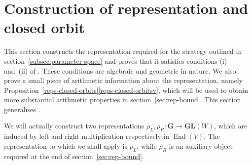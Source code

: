 \documentclass[JEP,XML,SOM,Unicode,NoFloatCountersInSection]{cedram}
\newcommand{\gG}{\mathbf{G}}
\newcommand{\gGL}{\mathbf{GL}}
\DeclareMathOperator{\End}{End}
\begin{document}
\section{Construction of representation and closed orbit} \label{sec:representation}

This section constructs the representation required for the strategy outlined in section~\ref{subsec:parameter-space} and proves that it satisfies conditions (i) and~(ii) of \cite[Th.\,1.2]{QRTUI}.
These conditions are algebraic and geometric in nature.
We also prove a small piece of arithmetic information about the representation, namely Proposition~\ref{reps-closed-orbits}\eqref{reps-closed-orbitsv}, which will be used to obtain more substantial arithmetic properties in section~\ref{sec:rep-bound}.
This section generalises \cite[\S\S 5.2 \&~5.3]{QRTUI}.

We will actually construct two representations $\rho_L, \rho_R \colon \gG \to \gGL(W)$, which are induced by left and right multiplication respectively in $\End(V)$.
The representation to which we shall apply \cite[Th.\,1.2]{QRTUI} is $\rho_L$, while $\rho_R$ is an auxiliary object required at the end of section~\ref{sec:rep-bound}.
\end{document}
